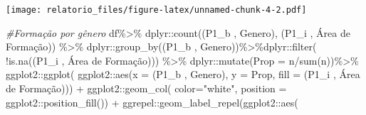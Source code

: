 \documentclass[
]{article}
\newenvironment{Shaded}{\begin{snugshade}}{\end{snugshade}}
\newcommand{\AttributeTok}[1]{\textcolor[rgb]{0.77,0.63,0.00}{#1}}
\newcommand{\CommentTok}[1]{\textcolor[rgb]{0.56,0.35,0.01}{\textit{#1}}}
\newcommand{\FunctionTok}[1]{\textcolor[rgb]{0.00,0.00,0.00}{#1}}
\newcommand{\NormalTok}[1]{#1}
\newcommand{\SpecialCharTok}[1]{\textcolor[rgb]{0.00,0.00,0.00}{#1}}
\newcommand{\StringTok}[1]{\textcolor[rgb]{0.31,0.60,0.02}{#1}}
\begin{document}
\texttt{[image: relatorio\_files/figure-latex/unnamed-chunk-4-2.pdf]}

\begin{Shaded}
\begin{Highlighting}[]
\CommentTok{\#Formação por gênero}
\NormalTok{df}\SpecialCharTok{\%\textgreater{}\%}
\NormalTok{  dplyr}\SpecialCharTok{::}\FunctionTok{count}\NormalTok{(}\StringTok{\textasciigrave{}}\AttributeTok{(\textquotesingle{}P1\_b \textquotesingle{}, \textquotesingle{}Genero\textquotesingle{})}\StringTok{\textasciigrave{}}\NormalTok{, }\StringTok{\textasciigrave{}}\AttributeTok{(\textquotesingle{}P1\_i \textquotesingle{}, \textquotesingle{}Área de Formação\textquotesingle{})}\StringTok{\textasciigrave{}}\NormalTok{) }\SpecialCharTok{\%\textgreater{}\%}
\NormalTok{  dplyr}\SpecialCharTok{::}\FunctionTok{group\_by}\NormalTok{(}\StringTok{\textasciigrave{}}\AttributeTok{(\textquotesingle{}P1\_b \textquotesingle{}, \textquotesingle{}Genero\textquotesingle{})}\StringTok{\textasciigrave{}}\NormalTok{)}\SpecialCharTok{\%\textgreater{}\%}\NormalTok{dplyr}\SpecialCharTok{::}\FunctionTok{filter}\NormalTok{(}
    \SpecialCharTok{!}\FunctionTok{is.na}\NormalTok{(}\StringTok{\textasciigrave{}}\AttributeTok{(\textquotesingle{}P1\_i \textquotesingle{}, \textquotesingle{}Área de Formação\textquotesingle{})}\StringTok{\textasciigrave{}}\NormalTok{)) }\SpecialCharTok{\%\textgreater{}\%}
\NormalTok{  dplyr}\SpecialCharTok{::}\FunctionTok{mutate}\NormalTok{(}\AttributeTok{Prop =}\NormalTok{ n}\SpecialCharTok{/}\FunctionTok{sum}\NormalTok{(n))}\SpecialCharTok{\%\textgreater{}\%}
\NormalTok{  ggplot2}\SpecialCharTok{::}\FunctionTok{ggplot}\NormalTok{(}
\NormalTok{    ggplot2}\SpecialCharTok{::}\FunctionTok{aes}\NormalTok{(}\AttributeTok{x =} \StringTok{\textasciigrave{}}\AttributeTok{(\textquotesingle{}P1\_b \textquotesingle{}, \textquotesingle{}Genero\textquotesingle{})}\StringTok{\textasciigrave{}}\NormalTok{, }\AttributeTok{y =}\NormalTok{ Prop,}
                 \AttributeTok{fill =} \StringTok{\textasciigrave{}}\AttributeTok{(\textquotesingle{}P1\_i \textquotesingle{}, \textquotesingle{}Área de Formação\textquotesingle{})}\StringTok{\textasciigrave{}}\NormalTok{)) }\SpecialCharTok{+}
\NormalTok{  ggplot2}\SpecialCharTok{::}\FunctionTok{geom\_col}\NormalTok{( }\AttributeTok{color=}\StringTok{"white"}\NormalTok{,}
                     \AttributeTok{position =}\NormalTok{ ggplot2}\SpecialCharTok{::}\FunctionTok{position\_fill}\NormalTok{()) }\SpecialCharTok{+}
\NormalTok{  ggrepel}\SpecialCharTok{::}\FunctionTok{geom\_label\_repel}\NormalTok{(ggplot2}\SpecialCharTok{::}\FunctionTok{aes}\NormalTok{(}

\end{Highlighting}
\end{Shaded}
\end{document}
